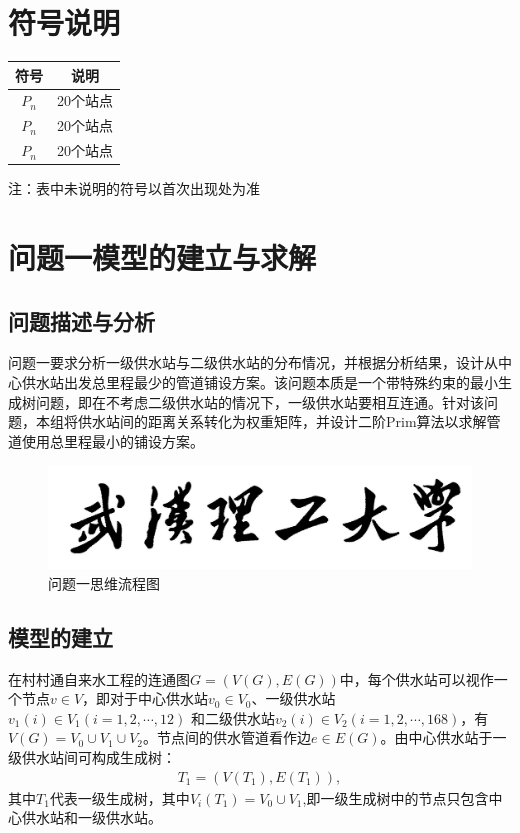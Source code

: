\documentclass{whutmod}
\begin{document}
		
	\section{符号说明}
		\begin{table}[H]
		\centering
		\setlength{\tabcolsep}{12mm}
		\begin{tabular}{cc}
			\toprule[1.5pt]
			\multicolumn{1}{m{5cm}}{\centering 符号} & \multicolumn{1}{m{5cm}}{\centering 说明} \\
			\midrule[1pt]		
			$P_n$  & 20个站点  \\ 
			$P_n$  & 20个站点  \\ 
		   	$P_n$  & 20个站点  \\ 
			\bottomrule[1.5pt]
		\end{tabular}
		\begin{tablenotes}
		\item 注：表中未说明的符号以首次出现处为准
		\end{tablenotes}
		\end{table}

	\section{问题一模型的建立与求解}
		\subsection{问题描述与分析}
			问题一要求分析一级供水站与二级供水站的分布情况，并根据分析结果，设计从中心供水站出发总里程最少的管道铺设方案。该问题本质是一个带特殊约束的最小生成树问题，即在不考虑二级供水站的情况下，一级供水站要相互连通。针对该问题，本组将供水站间的距离关系转化为权重矩阵，并设计二阶Prim算法以求解管道使用总里程最小的铺设方案。
			
		
			\begin{figure}[H]
				\centering
				\includegraphics[width=\textwidth]{figures/whut.jpg}
				\caption{问题一思维流程图}\label{lct}
			\end{figure}
			
		\subsection{模型的建立}
		在村村通自来水工程的连通图$G=(V(G),E(G))$中，每个供水站可以视作一个节点$v \in V$，即对于中心供水站$v_0 \in V_0$、一级供水站$v_1(i) \in V_1 (i=1,2,\cdots,12)$ 和二级供水站$v_2(i) \in V_2 (i=1,2,\cdots,168)$，有$V(G)=V_0\cup  V_1\cup V_2$。节点间的供水管道看作边$e \in E(G)$。由中心供水站于一级供水站间可构成生成树：
		\begin{gather*}
		T_{1}=(V(T_{1}),E(T_{1})),
		\end{gather*}
		其中$T_{1}$代表一级生成树，其中$V_{i}(T_{1})=V_0\cup  V_1$,即一级生成树中的节点只包含中心供水站和一级供水站。
		
\end{document}
